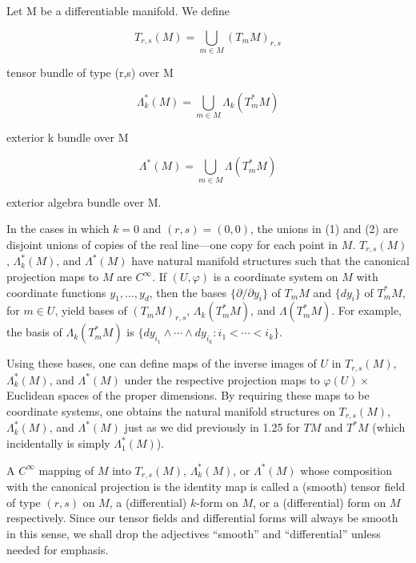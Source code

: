 \begin{definition}\label{thm:2.14}
Let M be a differentiable manifold. We define 

\[
T_{r,s}(M)=\bigcup_{m\in M}(T_{m} M)_{r,s}
\]

tensor bundle of type (r,s) over M

\[
\Lambda_{k}^{*}(M)=\bigcup_{m\in M}\Lambda_{k}(T_{m}^{*} M)
\]

exterior k bundle over M


\[
\Lambda^{*}(M)=\bigcup_{m\in M}\Lambda(T_{m}^{*} M)
\]

exterior algebra bundle over M. 

In the cases in which $k = 0$ and $(r,s) = (0,0)$, the unions in (1) and (2) are disjoint unions of copies of the real line—one copy for each point in $M$. $T_{r,s}(M)$, $\Lambda_{k}^{*}(M)$, and $\Lambda^{*}(M)$ have natural manifold structures such that the canonical projection maps to $M$ are $C^{\infty}$. If $(U,\varphi)$ is a coordinate system on $M$ with coordinate functions $y_{1}, \ldots, y_{d}$, then the bases $\{\partial/\partial y_{i}\}$ of $T_{m} M$ and $\{dy_{i}\}$ of $T_{m}^{*} M$, for $m \in U$, yield bases of $(T_{m} M)_{r,s}$, $\Lambda_{k}(T_{m}^{*} M)$, and $\Lambda(T_{m}^{*} M)$. For example, the basis of $\Lambda_{k}(T_{m}^{*} M)$ is $\{dy_{i_{1}} \wedge \cdots \wedge dy_{i_{k}}: i_{1} < \cdots < i_{k}\}$.

Using these bases, one can define maps of the inverse images of $U$ in $T_{r,s}(M)$, $\Lambda_{k}^{*}(M)$, and $\Lambda^{*}(M)$ under the respective projection maps to $\varphi(U) \times$ Euclidean spaces of the proper dimensions. By requiring these maps to be coordinate systems, one obtains the natural manifold structures on $T_{r,s}(M)$, $\Lambda_{k}^{*}(M)$, and $\Lambda^{*}(M)$ just as we did previously in 1.25 for $TM$ and $T^{*}M$ (which incidentally is simply $\Lambda_{1}^{*}(M)$).

\end{definition}

\begin{definition}\label{thm:2.15}
A $C^{\infty}$ mapping of $M$ into $T_{r,s}(M)$, $\Lambda_{k}^{*}(M)$, or $\Lambda^{*}(M)$ whose composition with the canonical projection is the identity map is called a (smooth) tensor field of type $(r,s)$ on $M$, a (differential) $k$-form on $M$, or a (differential) form on $M$ respectively. Since our tensor fields and differential forms will always be smooth in this sense, we shall drop the adjectives “smooth” and “differential” unless needed for emphasis. 

\end{definition}

